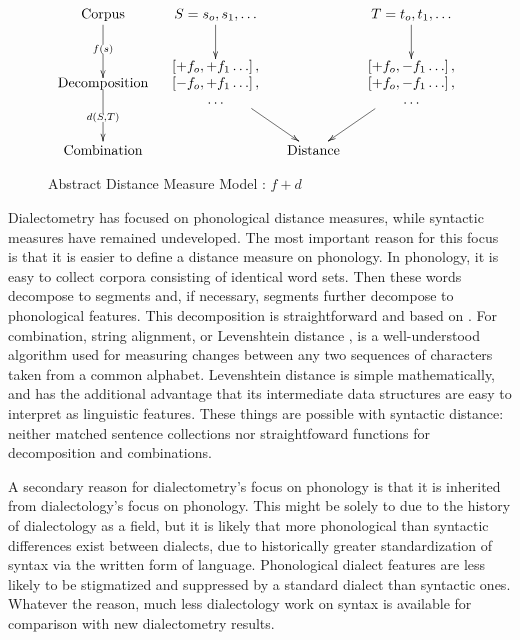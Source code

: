 \begin{figure}
\[\xymatrix@C=1pc{
 \textrm{Corpus} \ar@{>}[d]|{f(s)} &
  S = s_o,s_1,\ldots
  \ar@{>}[d] %
  &&
  T = t_o,t_1,\ldots
  \ar@{>}[d] %
  \\
 *\txt{Decomposition} \ar@{>}[d]|{d(S,T)} &
 *{\begin{array}{c}
     \left[ + f_o, +f_1 \ldots \right], \\
     \left[ - f_o, +f_1 \ldots \right], \\
     \ldots \\ \end{array}}
 \ar@{>}[dr]
 &&
 *{\begin{array}{c}
     \left[ + f_o, -f_1 \ldots \right], \\
     \left[ + f_o, -f_1 \ldots \right], \\
     \ldots \\ \end{array}}
 \ar@{>}[dl]  \\
 \textrm{Combination} &
 & \textrm{Distance} & \\
} \]
\label{abstract-distance-measure-model}
\caption{Abstract Distance Measure Model : $f + d$}
\end{figure}

Dialectometry has focused on phonological distance measures, while
syntactic measures have remained undeveloped. The most important
reason for this focus is that it is easier to define a distance
measure on phonology. In phonology, it is easy to collect corpora
consisting of identical word sets. Then these words decompose to segments and,
if necessary, segments further decompose to phonological
features. This decomposition is straightforward and based on
. For combination, string alignment, or Levenshtein
distance \cite{lev65}, is a well-understood algorithm used for
measuring changes between any two sequences of characters taken from a
common alphabet. Levenshtein distance is simple mathematically, and
has the additional advantage that its intermediate data structures are
easy to interpret as linguistic features. These things are possible
with syntactic distance: neither matched sentence collections nor
straightfoward functions for decomposition and combinations.

A secondary reason for dialectometry's focus on phonology is that it
is inherited from dialectology's focus on phonology.
This might be solely to due to the history of dialectology as a field, but it is
likely that more phonological than syntactic differences exist between
dialects, due to historically greater standardization
of syntax via the written form of language. Phonological
dialect features are less likely to be stigmatized and suppressed by a
standard dialect than syntactic ones.
Whatever the reason, much less dialectology work on syntax is
available for comparison with new dialectometry results.

